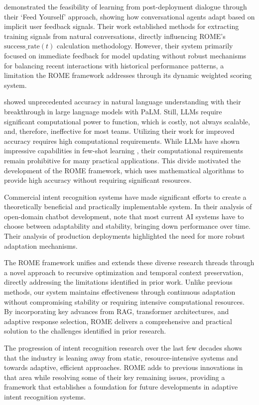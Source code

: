 \documentclass[12pt]{article}
\begin{document}
\citet{hancock2019} demonstrated the feasibility of learning from post-deployment dialogue through their `Feed Yourself' approach, showing how conversational agents adapt based on implicit user feedback signals. Their work established methods for extracting training signals from natural conversations, directly influencing ROME's $\text{success\_rate}(t)$ calculation methodology. However, their system primarily focused on immediate feedback for model updating without robust mechanisms for balancing recent interactions with historical performance patterns, a limitation the ROME framework addresses through its dynamic weighted scoring system.

\citet{chowdhery2022} showed unprecedented accuracy in natural language understanding with their breakthrough in large language models with PaLM. Still, LLMs require significant computational power to function, which is costly, not always scalable, and, therefore, ineffective for most teams. Utilizing their work for improved accuracy requires high computational requirements. While LLMs have shown impressive capabilities in few-shot learning \citep{brown2020}, their computational requirements remain prohibitive for many practical applications. This divide motivated the development of the ROME framework, which uses mathematical algorithms to provide high accuracy without requiring significant resources.

Commercial intent recognition systems have made significant efforts to create a theoretically beneficial and practically implementable system. In their analysis of open-domain chatbot development, \citet{roller2021} note that most current AI systems have to choose between adaptability and stability, bringing down performance over time. Their analysis of production deployments highlighted the need for more robust adaptation mechanisms.

The ROME framework unifies and extends these diverse research threads through a novel approach to recursive optimization and temporal context preservation, directly addressing the limitations identified in prior work. Unlike previous methods, our system maintains effectiveness through continuous adaptation without compromising stability or requiring intensive computational resources. By incorporating key advances from RAG, transformer architectures, and adaptive response selection, ROME delivers a comprehensive and practical solution to the challenges identified in prior research.

The progression of intent recognition research over the last few decades shows that the industry is leaning away from static, resource-intensive systems and towards adaptive, efficient approaches. ROME adds to previous innovations in that area while resolving some of their key remaining issues, providing a framework that establishes a foundation for future developments in adaptive intent recognition systems.
\end{document}
